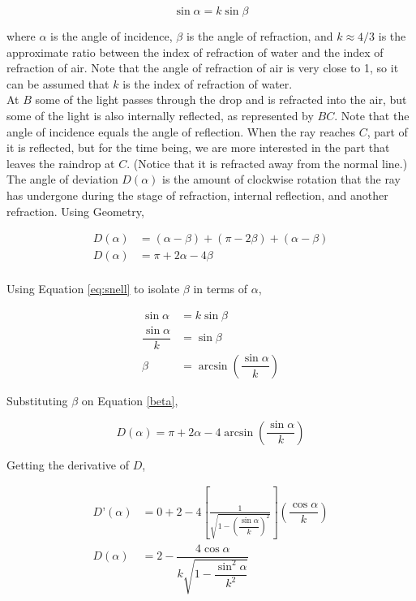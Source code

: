 \documentclass[a4paper,12pt]{article}
\begin{document}
\begin{equation} \label{eq:snell}
\sin \alpha = k \sin \beta
\end{equation}

where $\alpha$ is the angle of incidence, $\beta$ is the angle of refraction, and $k \approx 4/3$ is the approximate ratio between the index of refraction of water and the index of refraction of air. Note that the angle of refraction of air is very close to 1, so it can be assumed that $k$ is the index of refraction of water.\\

At $B$ some of the light passes through the drop and is refracted into the air, but some of the light is also internally reflected, as represented by $BC$. Note that the angle of incidence equals the angle of reflection. When the ray reaches $C$, part of it is reflected, but for the time being, we are more interested in the part that leaves the raindrop at $C$. (Notice that it is refracted away from the normal line.) \\

The angle of deviation $D(\alpha)$ is the amount of clockwise rotation that the ray has undergone during the stage of refraction, internal reflection, and another refraction. Using Geometry, 

\begin{align}
D(\alpha) &= (\alpha - \beta) + (\pi - 2\beta) +(\alpha - \beta) \nonumber\\
D(\alpha) &= \pi + 2\alpha - 4\beta\\
\end{align}

Using Equation \eqref{eq:snell} to isolate $\beta$ in terms of $\alpha$,

\begin{align}
\sin \alpha &= k \sin \beta \nonumber\\
\dfrac{\sin \alpha}{k} &= \sin \beta \nonumber\\
\beta &= \arcsin \left(\dfrac{\sin \alpha}{k} \right) \label{beta}
\end{align}

Substituting $\beta$ on Equation \eqref{beta},

\begin{equation}
D(\alpha) = \pi + 2\alpha - 4\arcsin \left( \dfrac{\sin \alpha}{k} \right)
\end{equation}

Getting the derivative of $D$,

\begin{align}
D’(\alpha) &= 0 + 2 - 4 \left[ \frac{1}{ \sqrt{1 -  \left( \dfrac{\sin \alpha}{k} \right) ^2 } } \right] \left(  \dfrac{\cos \alpha}{k} \right) \nonumber \\
D(\alpha) &= 2 - \dfrac{4 \cos \alpha}{k \sqrt{1 -  \dfrac{\sin^2 \alpha}{k^2}}}
\end{align}
\end{document}
